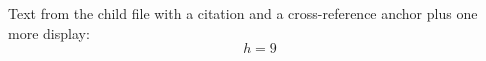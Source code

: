 Text from the child file with a citation \citep{lamport1994latex} and a
cross-reference anchor\label{child:mark} plus one more display:
\begin{equation}
  h = 9
\end{equation}
